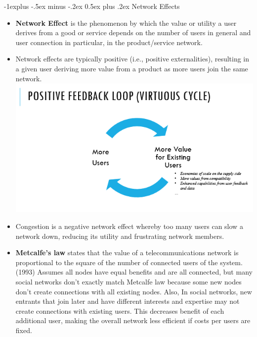 \documentclass[12pt, landscape]{article}
\makeatletter
\renewcommand{\subsection}{\@startsection{subsection}{2}{0mm}%
                                {-1explus -.5ex minus -.2ex}%
                                {0.5ex plus .2ex}%
                                {\normalfont\normalsize\bfseries}}
\makeatother
\begin{document}
\begin{multicols*}{3}
\subsection{Network Effects}
\begin{itemize}
\item\textbf{Network Effect} is the phenomenon by which the value or utility a user derives from a good or service depends on the number of users in general and user connection in particular, in the product/service network.
\item Network effects are typically positive (i.e., positive externalities), resulting in a given user deriving more value from a product as more users join the same network.
\includegraphics[width=\linewidth]{positiveFeedbackLoop}
\item Congestion is a negative network effect whereby too many users can slow a network down, reducing its utility and frustrating network members.
\item \textbf{Metcalfe's law} states that the value of a telecommunications network is proportional to the square of the number of connected users of the system. (1993) Assumes all nodes have equal benefits and are all connected, but many social networks don’t exactly match Metcalfe law because some new nodes don’t create connections with all existing nodes. Also, In social networks, new entrants that join later and have different interests and expertise may not create connections with existing users. This decreases benefit of each additional user, making the overall network less efficient if costs per users are fixed.
\end{itemize}

\end{multicols*}
\end{document}
